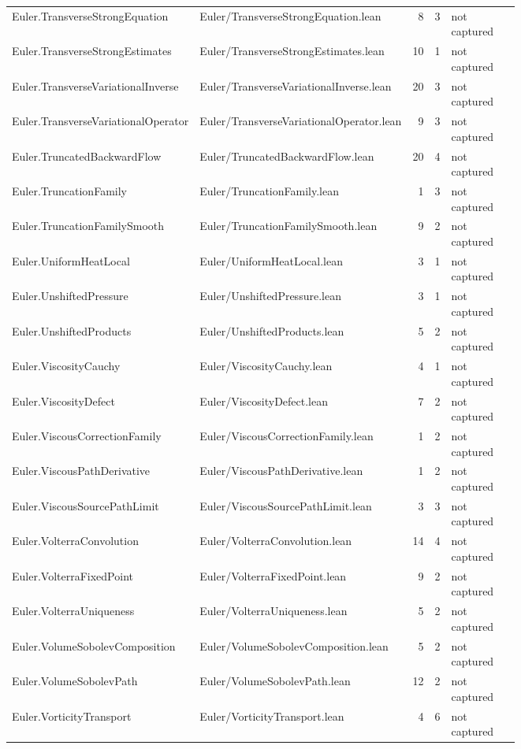 \documentclass[10pt]{article}
\begin{document}
\begin{longtable}{p{0.28\linewidth}p{0.27\linewidth}r r p{0.20\linewidth}}
Euler.TransverseStrongEquation & Euler/TransverseStrongEquation.lean & 8 & 3 & not captured\\
Euler.TransverseStrongEstimates & Euler/TransverseStrongEstimates.lean & 10 & 1 & not captured\\
Euler.TransverseVariationalInverse & Euler/TransverseVariationalInverse.lean & 20 & 3 & not captured\\
Euler.TransverseVariationalOperator & Euler/TransverseVariationalOperator.lean & 9 & 3 & not captured\\
Euler.TruncatedBackwardFlow & Euler/TruncatedBackwardFlow.lean & 20 & 4 & not captured\\
Euler.TruncationFamily & Euler/TruncationFamily.lean & 1 & 3 & not captured\\
Euler.TruncationFamilySmooth & Euler/TruncationFamilySmooth.lean & 9 & 2 & not captured\\
Euler.UniformHeatLocal & Euler/UniformHeatLocal.lean & 3 & 1 & not captured\\
Euler.UnshiftedPressure & Euler/UnshiftedPressure.lean & 3 & 1 & not captured\\
Euler.UnshiftedProducts & Euler/UnshiftedProducts.lean & 5 & 2 & not captured\\
Euler.ViscosityCauchy & Euler/ViscosityCauchy.lean & 4 & 1 & not captured\\
Euler.ViscosityDefect & Euler/ViscosityDefect.lean & 7 & 2 & not captured\\
Euler.ViscousCorrectionFamily & Euler/ViscousCorrectionFamily.lean & 1 & 2 & not captured\\
Euler.ViscousPathDerivative & Euler/ViscousPathDerivative.lean & 1 & 2 & not captured\\
Euler.ViscousSourcePathLimit & Euler/ViscousSourcePathLimit.lean & 3 & 3 & not captured\\
Euler.VolterraConvolution & Euler/VolterraConvolution.lean & 14 & 4 & not captured\\
Euler.VolterraFixedPoint & Euler/VolterraFixedPoint.lean & 9 & 2 & not captured\\
Euler.VolterraUniqueness & Euler/VolterraUniqueness.lean & 5 & 2 & not captured\\
Euler.VolumeSobolevComposition & Euler/VolumeSobolevComposition.lean & 5 & 2 & not captured\\
Euler.VolumeSobolevPath & Euler/VolumeSobolevPath.lean & 12 & 2 & not captured\\
Euler.VorticityTransport & Euler/VorticityTransport.lean & 4 & 6 & not captured\\

\end{longtable}
\end{document}
